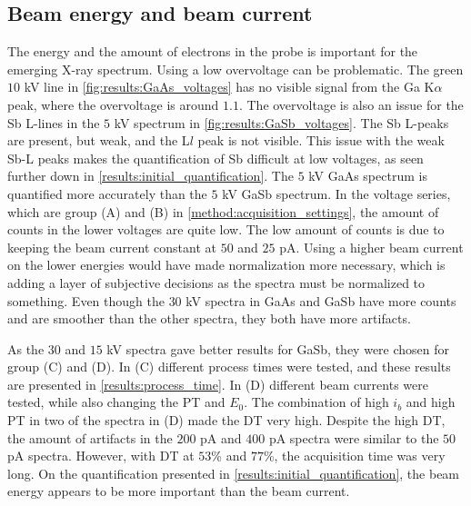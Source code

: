 


\subsection{Beam energy and beam current}
\label{results:beam_energy_and_beam_current}


The energy and the amount of electrons in the probe is important for the emerging X-ray spectrum.
Using a low overvoltage can be problematic.
The green $10$ kV line in \cref{fig:results:GaAs_voltages} has no visible signal from the Ga K$\alpha$ peak, where the overvoltage is around $1.1$.
The overvoltage is also an issue for the Sb L-lines in the $5$ kV spectrum in \cref{fig:results:GaSb_voltages}.
The Sb L-peaks are present, but weak, and the L$l$ peak is not visible.
This issue with the weak Sb-L peaks makes the quantification of Sb difficult at low voltages, as seen further down in \cref{results:initial_quantification}.
The $5$ kV GaAs spectrum is quantified more accurately than the $5$ kV GaSb spectrum.
In the voltage series, which are group (A) and (B) in \cref{method:acquisition_settings}, the amount of counts in the lower voltages are quite low.
The low amount of counts is due to keeping the beam current constant at $50$ and $25$ pA.
Using a higher beam current on the lower energies would have made normalization more necessary, which is adding a layer of subjective decisions as the spectra must be normalized to something.
Even though the $30$ kV spectra in GaAs and GaSb have more counts and are smoother than the other spectra, they both have more artifacts.

As the $30$ and $15$ kV spectra gave better results for GaSb, they were chosen for group (C) and (D).
In (C) different process times were tested, and these results are presented in \cref{results:process_time}.
In (D) different beam currents were tested, while also changing the PT and $E_0$.
The combination of high $i_b$ and high PT in two of the spectra in (D) made the DT very high.
Despite the high DT, the amount of artifacts in the $200$ pA and $400$ pA spectra were similar to the $50$ pA spectra.
However, with DT at $53$\% and $77$\%, the acquisition time was very long.
On the quantification presented in \cref{results:initial_quantification}, the beam energy appears to be more important than the beam current.







